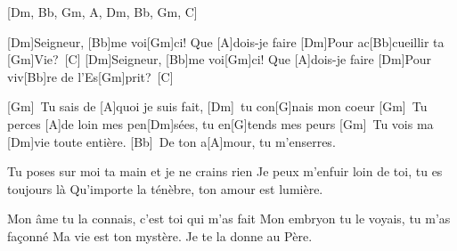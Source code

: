 [Dm, Bb, Gm, A, Dm, Bb, Gm, C]

[Dm]Seigneur, [Bb]me voi[Gm]ci!
Que [A]dois-je faire
[Dm]Pour ac[Bb]cueillir ta [Gm]Vie?\ [C]
[Dm]Seigneur, [Bb]me voi[Gm]ci!
Que [A]dois-je faire
[Dm]Pour viv[Bb]re de l’Es[Gm]prit?\ [C]

[Gm]\ Tu sais de [A]quoi je suis fait, [Dm]\ tu con[G]nais mon coeur
[Gm]\ Tu perces [A]de loin mes pen[Dm]sées, tu en[G]tends mes peurs
[Gm]\ Tu vois ma [Dm]vie toute entière. [Bb]\  De ton a[A]mour, tu m’enserres.

Tu poses sur moi ta main et je ne crains rien
Je peux m’enfuir loin de toi, tu es toujours là
Qu’importe la ténèbre, ton amour est lumière.

Mon âme tu la connais, c’est toi qui m’as fait
Mon embryon tu le voyais, tu m’as façonné
Ma vie est ton mystère. Je te la donne au Père.

\vfil
\eject

\IncludeLilypondShift


